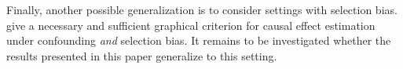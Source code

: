 \documentclass[11pt,a4paper]{article}
\theoremstyle{definition}
\theoremstyle{remark}
\begin{document}
Finally, another possible generalization is to consider settings with selection bias. \citet{correa2018generalized} give a necessary and sufficient graphical criterion for causal effect estimation under confounding \textit{and} selection bias. It remains to be investigated whether the results presented in this paper generalize to this setting. 






%

%
%
\end{document}
